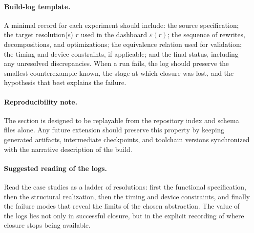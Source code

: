 \paragraph{Build-log template.} A minimal record for each experiment should include: the source specification; the target resolution(s) \(r\) used in the dashboard \(\varepsilon(r)\); the sequence of rewrites, decompositions, and optimizations; the equivalence relation used for validation; the timing and device constraints, if applicable; and the final status, including any unresolved discrepancies. When a run fails, the log should preserve the smallest counterexample known, the stage at which closure was lost, and the hypothesis that best explains the failure.

\paragraph{Reproducibility note.} The section is designed to be replayable from the repository index and schema files alone. Any future extension should preserve this property by keeping generated artifacts, intermediate checkpoints, and toolchain versions synchronized with the narrative description of the build.

\paragraph{Suggested reading of the logs.} Read the case studies as a ladder of resolutions: first the functional specification, then the structural realization, then the timing and device constraints, and finally the failure modes that reveal the limits of the chosen abstraction. The value of the logs lies not only in successful closure, but in the explicit recording of where closure stops being available.
